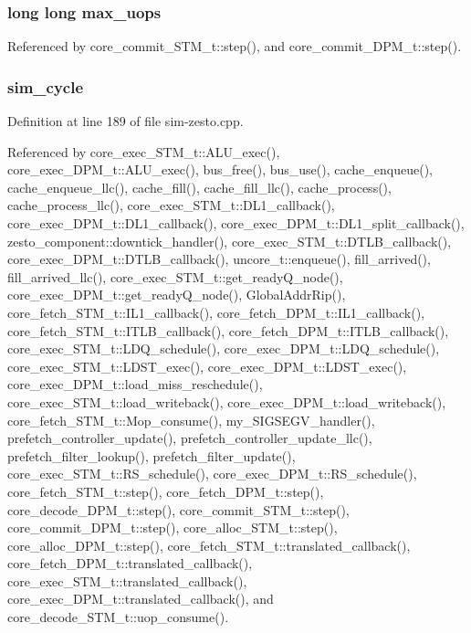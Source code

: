 \subsubsection[{max\_\-uops}]{\setlength{\rightskip}{0pt plus 5cm}long long {\bf max\_\-uops}}\label{zesto-opts_8h_1c19194f53ec4ac28fd2ceb40ea00ef7}




Referenced by core\_\-commit\_\-STM\_\-t::step(), and core\_\-commit\_\-DPM\_\-t::step().
\subsubsection[{sim\_\-cycle}]{ {\bf sim\_\-cycle}}\label{zesto-opts_8h_d93be82106e505ae03e3a443a62d7238}




Definition at line 189 of file sim-zesto.cpp.

Referenced by core\_\-exec\_\-STM\_\-t::ALU\_\-exec(), core\_\-exec\_\-DPM\_\-t::ALU\_\-exec(), bus\_\-free(), bus\_\-use(), cache\_\-enqueue(), cache\_\-enqueue\_\-llc(), cache\_\-fill(), cache\_\-fill\_\-llc(), cache\_\-process(), cache\_\-process\_\-llc(), core\_\-exec\_\-STM\_\-t::DL1\_\-callback(), core\_\-exec\_\-DPM\_\-t::DL1\_\-callback(), core\_\-exec\_\-DPM\_\-t::DL1\_\-split\_\-callback(), zesto\_\-component::downtick\_\-handler(), core\_\-exec\_\-STM\_\-t::DTLB\_\-callback(), core\_\-exec\_\-DPM\_\-t::DTLB\_\-callback(), uncore\_\-t::enqueue(), fill\_\-arrived(), fill\_\-arrived\_\-llc(), core\_\-exec\_\-STM\_\-t::get\_\-readyQ\_\-node(), core\_\-exec\_\-DPM\_\-t::get\_\-readyQ\_\-node(), GlobalAddrRip(), core\_\-fetch\_\-STM\_\-t::IL1\_\-callback(), core\_\-fetch\_\-DPM\_\-t::IL1\_\-callback(), core\_\-fetch\_\-STM\_\-t::ITLB\_\-callback(), core\_\-fetch\_\-DPM\_\-t::ITLB\_\-callback(), core\_\-exec\_\-STM\_\-t::LDQ\_\-schedule(), core\_\-exec\_\-DPM\_\-t::LDQ\_\-schedule(), core\_\-exec\_\-STM\_\-t::LDST\_\-exec(), core\_\-exec\_\-DPM\_\-t::LDST\_\-exec(), core\_\-exec\_\-DPM\_\-t::load\_\-miss\_\-reschedule(), core\_\-exec\_\-STM\_\-t::load\_\-writeback(), core\_\-exec\_\-DPM\_\-t::load\_\-writeback(), core\_\-fetch\_\-STM\_\-t::Mop\_\-consume(), my\_\-SIGSEGV\_\-handler(), prefetch\_\-controller\_\-update(), prefetch\_\-controller\_\-update\_\-llc(), prefetch\_\-filter\_\-lookup(), prefetch\_\-filter\_\-update(), core\_\-exec\_\-STM\_\-t::RS\_\-schedule(), core\_\-exec\_\-DPM\_\-t::RS\_\-schedule(), core\_\-fetch\_\-STM\_\-t::step(), core\_\-fetch\_\-DPM\_\-t::step(), core\_\-decode\_\-DPM\_\-t::step(), core\_\-commit\_\-STM\_\-t::step(), core\_\-commit\_\-DPM\_\-t::step(), core\_\-alloc\_\-STM\_\-t::step(), core\_\-alloc\_\-DPM\_\-t::step(), core\_\-fetch\_\-STM\_\-t::translated\_\-callback(), core\_\-fetch\_\-DPM\_\-t::translated\_\-callback(), core\_\-exec\_\-STM\_\-t::translated\_\-callback(), core\_\-exec\_\-DPM\_\-t::translated\_\-callback(), and core\_\-decode\_\-STM\_\-t::uop\_\-consume().
